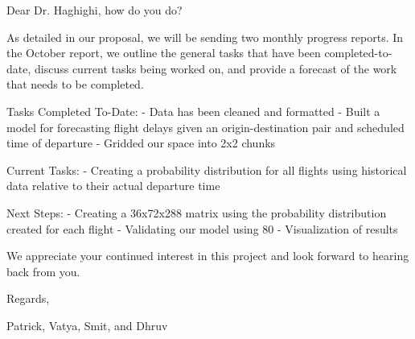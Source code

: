 Dear Dr. Haghighi, how do you do?
 
As detailed in our proposal, we will be sending two monthly progress reports. In the October report, we outline the general tasks that have been completed-to-date, discuss current tasks being worked on, and provide a forecast of the work that needs to be completed.
 
Tasks Completed To-Date:
- Data has been cleaned and formatted
- Built a model for forecasting flight delays given an origin-destination pair and scheduled time of departure
- Gridded our space into 2x2 chunks

Current Tasks: 
- Creating a probability distribution for all flights using historical data relative to their actual departure time

Next Steps:
- Creating a 36x72x288 matrix using the probability distribution created for each flight
- Validating our model using 80%
- Visualization of results
 
We appreciate your continued interest in this project and look forward to hearing back from you.
 
Regards,
 
Patrick, Vatya, Smit, and Dhruv 
